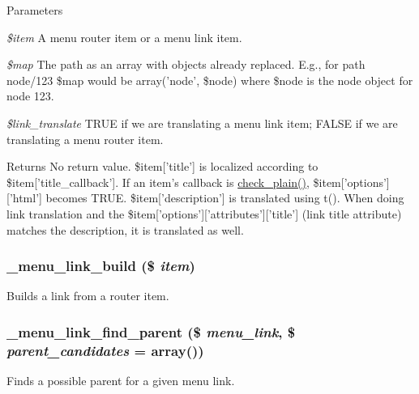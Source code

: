 \begin{DoxyParams}{Parameters}
\item[{\em \$item}]A menu router item or a menu link item. \item[{\em \$map}]The path as an array with objects already replaced. E.g., for path node/123 \$map would be array('node', \$node) where \$node is the node object for node 123. \item[{\em \$link\_\-translate}]TRUE if we are translating a menu link item; FALSE if we are translating a menu router item.\end{DoxyParams}
\begin{DoxyReturn}{Returns}
No return value. \$item\mbox{[}'title'\mbox{]} is localized according to \$item\mbox{[}'title\_\-callback'\mbox{]}. If an item's callback is \hyperlink{group__sanitization_ga76fc67a30fd8d75ddd80565e6e65a13d}{check\_\-plain()}, \$item\mbox{[}'options'\mbox{]}\mbox{[}'html'\mbox{]} becomes TRUE. \$item\mbox{[}'description'\mbox{]} is translated using t(). When doing link translation and the \$item\mbox{[}'options'\mbox{]}\mbox{[}'attributes'\mbox{]}\mbox{[}'title'\mbox{]} (link title attribute) matches the description, it is translated as well. 
\end{DoxyReturn}
\hypertarget{group__menu_gadf1f694a2079dcdd6526150eb195915b}{
\subsubsection[{\_\-menu\_\-link\_\-build}]{\setlength{\rightskip}{0pt plus 5cm}\_\-menu\_\-link\_\-build (\$ {\em item})}}
\label{group__menu_gadf1f694a2079dcdd6526150eb195915b}
Builds a link from a router item. \hypertarget{group__menu_ga4a310e057a335748d2d3c4bd9cb02a15}{
\subsubsection[{\_\-menu\_\-link\_\-find\_\-parent}]{\setlength{\rightskip}{0pt plus 5cm}\_\-menu\_\-link\_\-find\_\-parent (\$ {\em menu\_\-link}, \/  \$ {\em parent\_\-candidates} = {\ttfamily array()})}}
\label{group__menu_ga4a310e057a335748d2d3c4bd9cb02a15}
Finds a possible parent for a given menu link.

